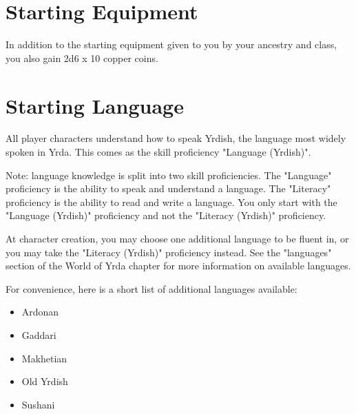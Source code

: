 \begin{multicols}{2}
\section{Starting Equipment}

In addition to the starting equipment given to you by your ancestry and class,
you also gain 2d6 x 10 copper coins.

\section{Starting Language}

All player characters understand how to speak Yrdish, the language most
widely spoken in Yrda. This comes as the skill proficiency
"Language (Yrdish)".  

Note: language knowledge is split into two skill proficiencies. The "Language"
proficiency is the ability to speak and understand a language. The "Literacy"
proficiency is the ability to read and write a language. You only start with
the "Language (Yrdish)" proficiency and not the "Literacy (Yrdish)" proficiency.

At character creation, you may choose one additional language to be fluent in,
or you may take the "Literacy (Yrdish)" proficiency instead. See the "languages"
section of the World of Yrda chapter for more information on available languages.

For convenience, here is a short list of additional languages available:

\begin{itemize}
  \item Ardonan
  \item Gaddari
  \item Makhetian
  \item Old Yrdish
  \item Sushani
\end{itemize}

\end{multicols}
